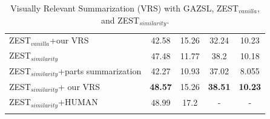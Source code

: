 \documentclass[11pt,a4paper]{article}
\begin{document}
\begin{table}[t]
{\begin{tabular}{l|cc|cc}
                 
  ZEST$_{vanilla}$+our VRS                             & {42.58}                                  & {15.26}                                 & {32.24}      & {10.23}        \\
ZEST$_{similarity}$                                & 47.48                                           & 11.77                                          & 38.2
                & 10.18                 \\
ZEST$_{similarity}$+parts summarization                                & 42.27
                                           & 10.93
                                          & 37.02

                & 8.055
                 \\
ZEST$_{similarity}$+ our VRS                             & \textbf{48.57}                                  & {15.26}                                 & \textbf{38.51}      & \textbf{10.23}        \\

ZEST$_{similarity}$+HUMAN                          & 48.99                                & 17.2                                           & -                    & -                     \\ 
\Xhline{6\arrayrulewidth}
\end{tabular}
}
    \caption{Visually Relevant Summarization (VRS) with GAZSL, ZEST$_{vanilla}$, and ZEST$_{similarity}$.  }%
    \label{table:summarization}%
\end{table}





\begin{table}[t]
\centering
    \caption{Zest model with different similarity methods}%
    \label{table:similarity}%
\end{table}
\end{document}
